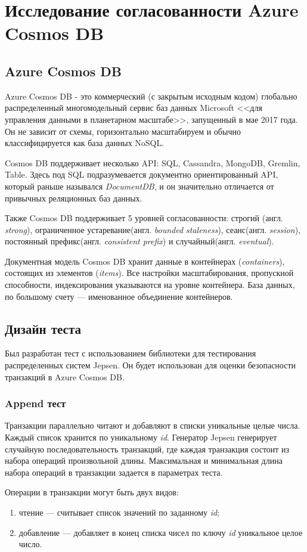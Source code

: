 \documentclass[12pt,  openany]{book}
\begin{document}
\chapter{Исследование согласованности Azure Cosmos DB}
\section{Azure Cosmos DB}
Azure Cosmos DB - это коммерческий (с закрытым исходным кодом) глобально распределенный многомодельный сервис баз данных Microsoft <<для управления данными в планетарном масштабе>>, запущенный в мае 2017 года. Он не зависит от схемы, горизонтально масштабируем и обычно классифицируется как база данных NoSQL.
\par Cosmos DB поддерживает несколько API: SQL, Cassandra, MongoDB, Gremlin, Table. Здесь под SQL подразумевается документно ориентированный API, который раньше назывался \textit{DocumentDB}, и он значительно отличается от привычных реляционных баз данных.
\par Также Cosmos DB поддерживает 5 уровней согласованности: строгий (англ.  \textit{strong}), ограниченное устаревание(англ.  \textit{bounded staleness}), сеанс(англ.  \textit{session}), постоянный префикс(англ.  \textit{consistent prefix}) и случайный(англ.  \textit{eventual}).
\par Документная модель Cosmos DB хранит данные в контейнерах (\textit{containers}), состоящих из элементов (\textit{items}). Все настройки масштабирования, пропускной способности, индексирования указываются на уровне контейнера. База данных, по большому счету --- именованное объединение контейнеров.

\section{Дизайн теста}
Был разработан тест с использованием библиотеки для тестирования распределенных систем Jepsen. Он будет использован для оценки безопасности транзакций в Azure Cosmos DB. 
\subsection{Append тест}
Транзакции параллельно читают и добавляют в списки уникальные целые числа. Каждый список хранится по уникальному \textit{id}.  Генератор Jepsen генерирует случайную последовательность транзакций, где каждая транзакция состоит из набора операций произвольной длины. Максимальная и минимальная длина набора операций в транзакции задается в параметрах теста. 
\par Операции в транзакции могут быть двух видов:
\begin{enumerate}
\item чтение --- считывает список значений по заданному \textit{id};
\item добавление --- добавляет в конец списка чисел по ключу \textit{id} уникальное целое число.
\end{enumerate}
\end{document}
